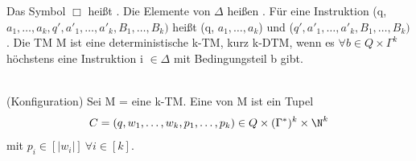 \documentclass[a4paper]{article}
\begin{document}
Das Symbol $\Box$ heißt . Die Elemente von $\Delta$ heißen . Für eine Instruktion (q, $a_1,\dots,a_k, q', a'_1,\dots,a'_k, B_1,\dots,B_k)$ heißt (q, $a_1,\dots,a_k$)  und ($q', a'_1,\dots,a'_k, B_1,\dots,B_k)$ . Die TM M ist eine deterministische k-TM, kurz k-DTM, wenn es $\forall b \in Q \times \Gamma^k$ höchstens eine Instruktion i $\in \Delta$ mit Bedingungsteil b gibt. \\
\\
\begin{DefBox}{(Konfiguration)}
Sei M = \TM eine k-TM. Eine  von M ist ein Tupel
\begin{align*}
 C = (q,w_1,\dots,w_k,p_1,\dots,p_k) \in Q \times (\Gamma^*)^k \times \N^k
\end{align*}
mit $p_i \in [|w_i|] \ \forall i \in [k]$.
\end{DefBox}
\end{document}
